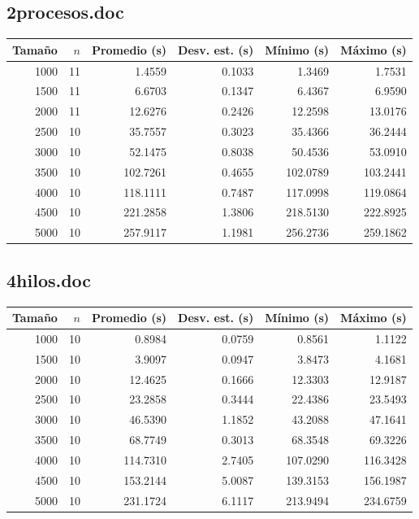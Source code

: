 \documentclass[conference]{IEEEtran}
\begin{document}
\subsection{2procesos.doc}
\begin{center}
\begin{tabular}{rrrrrr}
\toprule
Tamaño & $n$ & Promedio (s) & Desv. est. (s) & Mínimo (s) & Máximo (s) \\
\midrule
1000 & 11 & 1.4559 & 0.1033 & 1.3469 & 1.7531 \\
1500 & 11 & 6.6703 & 0.1347 & 6.4367 & 6.9590 \\
2000 & 11 & 12.6276 & 0.2426 & 12.2598 & 13.0176 \\
2500 & 10 & 35.7557 & 0.3023 & 35.4366 & 36.2444 \\
3000 & 10 & 52.1475 & 0.8038 & 50.4536 & 53.0910 \\
3500 & 10 & 102.7261 & 0.4655 & 102.0789 & 103.2441 \\
4000 & 10 & 118.1111 & 0.7487 & 117.0998 & 119.0864 \\
4500 & 10 & 221.2858 & 1.3806 & 218.5130 & 222.8925 \\
5000 & 10 & 257.9117 & 1.1981 & 256.2736 & 259.1862 \\
\bottomrule
\end{tabular}
\end{center}
\subsection{4hilos.doc}
\begin{center}
\begin{tabular}{rrrrrr}
\toprule
Tamaño & $n$ & Promedio (s) & Desv. est. (s) & Mínimo (s) & Máximo (s) \\
\midrule
1000 & 10 & 0.8984 & 0.0759 & 0.8561 & 1.1122 \\
1500 & 10 & 3.9097 & 0.0947 & 3.8473 & 4.1681 \\
2000 & 10 & 12.4625 & 0.1666 & 12.3303 & 12.9187 \\
2500 & 10 & 23.2858 & 0.3444 & 22.4386 & 23.5493 \\
3000 & 10 & 46.5390 & 1.1852 & 43.2088 & 47.1641 \\
3500 & 10 & 68.7749 & 0.3013 & 68.3548 & 69.3226 \\
4000 & 10 & 114.7310 & 2.7405 & 107.0290 & 116.3428 \\
4500 & 10 & 153.2144 & 5.0087 & 139.3153 & 156.1987 \\
5000 & 10 & 231.1724 & 6.1117 & 213.9494 & 234.6759 \\
\bottomrule
\end{tabular}
\end{center}
\end{document}
